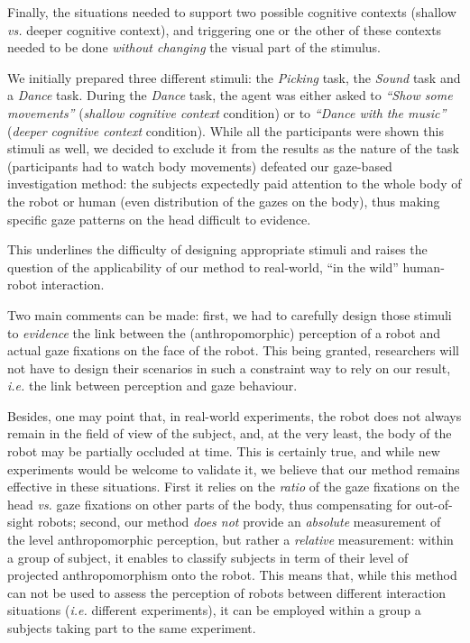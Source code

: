 \documentclass[lettersize, noapacite, twoside, HRI]{apa_HRI}
\newcommand{\ie}{\textit{i.e.}\xspace}
\newcommand{\vs}{\textit{vs.}\xspace}
\begin{document}
Finally, the situations needed to support two possible cognitive contexts
(shallow \vs deeper cognitive context), and triggering one or the other of these
contexts needed to be done \emph{without changing} the visual part of the
stimulus.

We initially prepared three different stimuli: the \emph{Picking} task, the
\emph{Sound} task and a \emph{Dance} task.  During the \emph{Dance} task, the
agent was either asked to \emph{``Show some movements''} (\emph{shallow
cognitive context} condition) or to \emph{``Dance with the music''}
(\emph{deeper cognitive context} condition). While all the participants were
shown this stimuli as well, we decided to exclude it from the results as the
nature of the task (participants had to watch body movements) defeated our
gaze-based investigation method: the subjects expectedly paid attention to the
whole body of the robot or human (even distribution of the gazes on the body),
thus making specific gaze patterns on the head difficult to evidence.

This underlines the difficulty of designing appropriate stimuli and raises the
question of the applicability of our method to real-world, ``in the wild''
human-robot interaction.

Two main comments can be made: first, we had to carefully design those stimuli
to \emph{evidence} the link between the (anthropomorphic) perception of a robot
and actual gaze fixations on the face of the robot. This being granted,
researchers will not have to design their scenarios in such a constraint way to
rely on our result, \ie the link between perception and gaze behaviour.

Besides, one may point that, in real-world experiments, the robot does not
always remain in the field of view of the subject, and, at the very least, the
body of the robot may be partially occluded at time.  This is certainly true,
and while new experiments would be welcome to validate it, we believe that our
method remains effective in these situations. First it relies on the
\emph{ratio} of the gaze fixations on the head \vs gaze fixations on other parts
of the body, thus compensating for out-of-sight robots; second, our method
\emph{does not} provide an \emph{absolute} measurement of the level
anthropomorphic perception, but rather a \emph{relative} measurement: within a
group of subject, it enables to classify subjects in term of their level of
projected anthropomorphism onto the robot.  This means that, while this method
can not be used to assess the perception of robots between different interaction
situations (\ie different experiments), it can be employed within a group a
subjects taking part to the same experiment.
\end{document}
